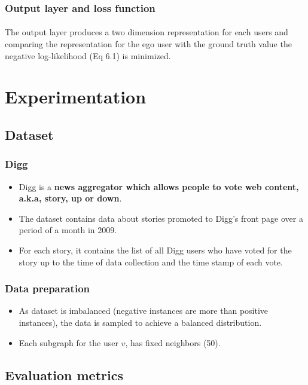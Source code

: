 \subsubsection{Output layer and loss function}

\paragraph{} The output layer produces a two dimension representation for each users and comparing the representation for
the ego user with the ground truth value the negative log-likelihood (Eq 6.1) is minimized.

\section{Experimentation}

\subsection{Dataset}

\subsubsection{Digg}
\begin{itemize}
    \item Digg is a \textbf{news aggregator which allows people to vote web content, a.k.a, story, up or down}.
    \item The dataset contains data about stories promoted to Digg’s front page over a period of a month in 2009.
    \item For each story, it contains the list of all Digg users who have voted for the story up to the 
    time of data collection and the time stamp of each vote.
\end{itemize}

\subsubsection{Data preparation}
\begin{itemize}
    \item As dataset is imbalanced (negative instances are more than positive instances), the data is sampled to achieve a balanced distribution.
    \item Each subgraph for the user $v$, has fixed neighbors (50).
\end{itemize}

\subsection{Evaluation metrics}

